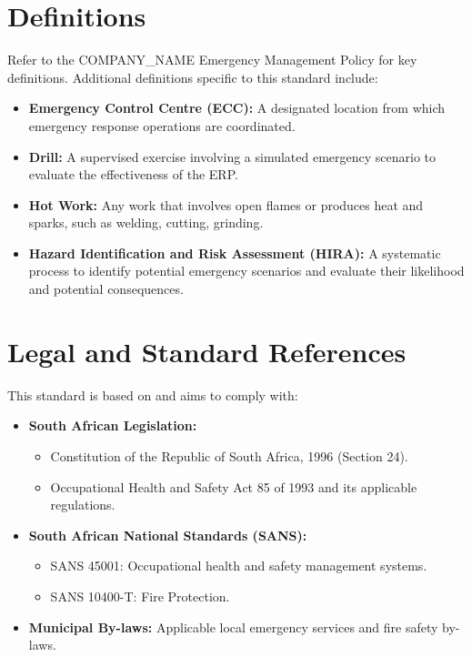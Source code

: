 \documentclass[12pt]{article}
\begin{document}
\section{Definitions}
Refer to the {{COMPANY_NAME}} Emergency Management Policy for key definitions. Additional definitions specific to this standard include:
\begin{itemize}
    \item \textbf{Emergency Control Centre (ECC):} A designated location from which emergency response operations are coordinated.
    \item \textbf{Drill:} A supervised exercise involving a simulated emergency scenario to evaluate the effectiveness of the ERP.
    \item \textbf{Hot Work:} Any work that involves open flames or produces heat and sparks, such as welding, cutting, grinding.
    \item \textbf{Hazard Identification and Risk Assessment (HIRA):} A systematic process to identify potential emergency scenarios and evaluate their likelihood and potential consequences.
\end{itemize}

\section{Legal and Standard References}
This standard is based on and aims to comply with:
\begin{itemize}
    \item \textbf{South African Legislation:}
    \begin{itemize}
        \item Constitution of the Republic of South Africa, 1996 (Section 24).
        \item Occupational Health and Safety Act 85 of 1993 and its applicable regulations.
    \end{itemize}
    \item \textbf{South African National Standards (SANS):}
    \begin{itemize}
        \item SANS 45001: Occupational health and safety management systems.
        \item SANS 10400-T: Fire Protection.
    \end{itemize}
    \item \textbf{Municipal By-laws:} Applicable local emergency services and fire safety by-laws.
\end{itemize}
\end{document}
